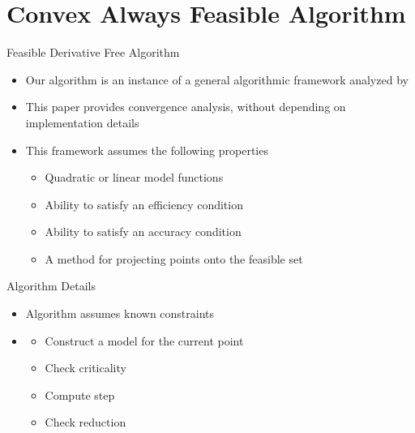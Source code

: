 \documentclass{beamer}
\begin{document}

\section{Convex Always Feasible Algorithm}


\begin{frame}{Feasible Derivative Free Algorithm}
    \begin{itemize}
        \item Our algorithm is an instance of a general algorithmic framework analyzed by \cite{CONEJO2013324}
        \item This paper provides convergence analysis, without depending on implementation details
        \item This framework assumes the following properties
            \begin{itemize}
				\item Quadratic or linear model functions
                \item Ability to satisfy an efficiency condition
                \item Ability to satisfy an accuracy condition
                \item A method for projecting points onto the feasible set
            \end{itemize}
    \end{itemize}
\end{frame}


\begin{frame}{Algorithm Details}
	\begin{itemize}
		\item Algorithm assumes known constraints
		\item
			\begin{itemize}
				\item Construct a model for the current point
				\item Check criticality
				\item Compute step
				\item Check reduction
			\end{itemize}
	\end{itemize}
\end{frame}
\end{document}
